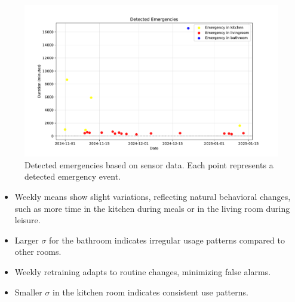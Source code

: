 \documentclass[A4,10pt]{article}
\begin{document}
\begin{figure}[H]
	\centering
	\includegraphics[width=1.15\textwidth]{detected_emergencies.pdf}
	\caption{Detected emergencies based on sensor data. Each point represents a detected emergency event.}
	\label{fig:detected_emergencies}
\end{figure}

\begin{itemize}
\item Weekly means show slight variations, reflecting natural behavioral changes, such as more time in the kitchen during meals or in the living room during leisure.
\item Larger \(\sigma\) for the bathroom indicates irregular usage patterns compared to other rooms.
\item  Weekly retraining adapts to routine changes, minimizing false alarms.
\item Smaller \(\sigma\) in the kitchen room indicates consistent use patterns.

\end{itemize}
\end{document}
